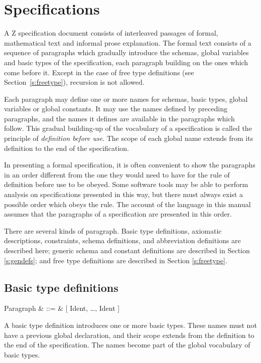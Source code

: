 \section{Specifications}\label{s:spec}

A Z specification document consists of interleaved passages of formal,
mathematical text and informal prose explanation.  The formal text
consists of a sequence of paragraphs which gradually
introduce the schemas, global variables and basic types of the
specification, each paragraph building on the ones which come before
it. Except in the case of free type definitions (see
Section~\ref{s:freetype}), recursion is not allowed.

Each paragraph may define one or more names for schemas, basic types,
global variables or global constants.  It may use the names defined
by preceding paragraphs, and the names it defines are available in the
paragraphs which follow.  This gradual building-up of the vocabulary
of a specification is called the principle of {\em definition before
use}.%
The scope of each global name
extends from its definition to the end of the specification.

In presenting a formal specification, it is often convenient to show
the paragraphs in an order different from
the one they would need to have for the rule of definition before use
to be obeyed. Some software tools may be able to perform analysis on
specifications presented in this way, but there must always exist a
possible order which obeys the rule. The account of the language in
this manual assumes that the paragraphs of a specification are
presented in this order.

There are several kinds of paragraph. Basic type definitions,
axiomatic descriptions, constraints, schema definitions, and
abbreviation definitions are described here; generic schema and
constant definitions are described in Section \ref{s:gendefs}; and
free type definitions are described in Section \ref{s:freetype}.

\subsection{Basic type definitions}\label{ss:basictype}

\begin{syntax}
       Paragraph & ::= & [ Ident, \ldots, Ident ]
\end{syntax}
A basic type definition introduces one
or more basic types.  These names must not have a previous global
declaration, and their scope extends from the definition to the end
of the specification.  The names become part of the global
vocabulary of basic types.


